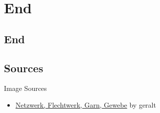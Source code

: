 \section*{End}
\subsection*{End}


\subsection*{Sources}
\begin{frame}{Image Sources}
    \begin{itemize}
        \item \href{https://pixabay.com/de/netzwerk-flechtwerk-garn-gewebe-440738/}{Netzwerk, Flechtwerk, Garn, Gewebe} by geralt
    \end{itemize}
\end{frame}
